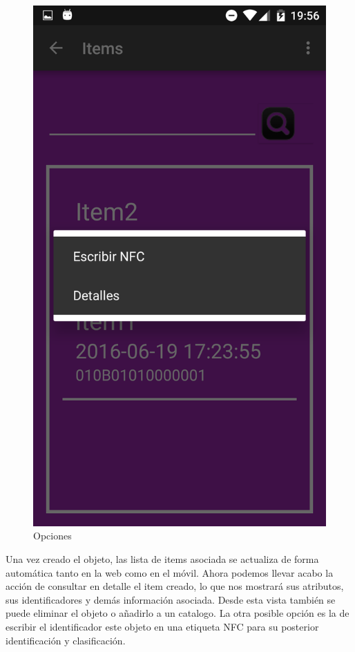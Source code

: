 \documentclass[a4paper,11pt]{book}
\begin{document}
\begin{figure}[H]
  \includegraphics[width=\linewidth]{imagenes/pruebas/movil/movil6.png}
  \caption{Opciones\cite{propio}}
\endminipage\hfill
\end{figure}

Una vez creado el objeto, las lista de items asociada se actualiza de forma automática tanto en la web como en el móvil. Ahora podemos llevar acabo la acción  de consultar en detalle el item creado, lo que nos mostrará sus atributos, sus identificadores y demás información asociada. Desde esta vista también se puede eliminar el objeto o añadirlo a un catalogo. La  otra posible opción es la de escribir el identificador este objeto en una etiqueta NFC para su posterior identificación y clasificación.
\end{document}
